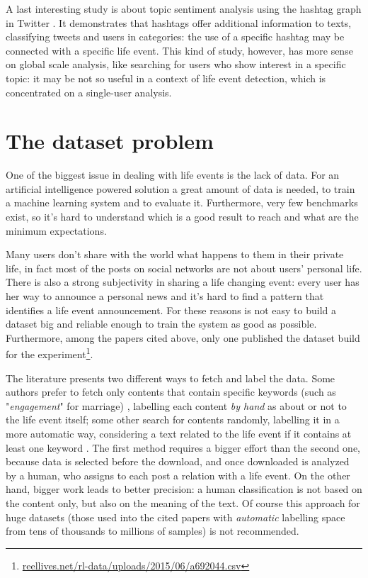 A last interesting study is about topic sentiment analysis using the hashtag graph in Twitter \cite{wang2011topic}. It demonstrates that hashtags offer additional information to texts, classifying tweets and users in categories: the use of a specific hashtag may be connected with a specific life event. This kind of study, however, has more sense on global scale analysis, like searching for users who show interest in a specific topic: it may be not so useful in a context of life event detection, which is concentrated on a single-user analysis.


\section{The dataset problem}
\label{sec:dataset}
One of the biggest issue in dealing with life events is the lack of data. For an artificial intelligence powered solution a great amount of data is needed, to train a machine learning system and to evaluate it. Furthermore, very few benchmarks exist, so it's hard to understand which is a good result to reach and what are the minimum expectations.

Many users don't share with the world what happens to them in their private life, in fact most of the posts on social networks are not about users' personal life. There is also a strong subjectivity in sharing a life changing event: every user has her way to announce a personal news and it's hard to find a pattern that identifies a life event announcement. For these reasons is not easy to build a dataset big and reliable enough to train the system as good as possible. Furthermore, among the papers cited above, only one \cite{dickinson2015identifying} published the dataset build for the experiment\footnote{\url{reellives.net/rl-data/uploads/2015/06/a692044.csv}}.

The literature presents two different ways to fetch and label the data. Some authors prefer to fetch only contents that contain specific keywords (such as "\textit{engagement}" for marriage) \cite{dickinson2015identifying, khobarekar2013detecting}, labelling each content \textit{by hand} as about or not to the life event itself; some other search for contents randomly, labelling it in a more automatic way, considering a text related to the life event if it contains at least one keyword \cite{choudhury2014personal, di2013detecting, moyanolife}. The first method requires a bigger effort than the second one, because data is selected before the download, and once downloaded is analyzed by a human, who assigns to each post a relation with a life event. On the other hand, bigger work leads to better precision: a human classification is not based on the content only, but also on the meaning of the text. Of course this approach for huge datasets (those used into the cited papers with \textit{automatic} labelling space from tens of thousands to millions of samples) is not recommended. 

